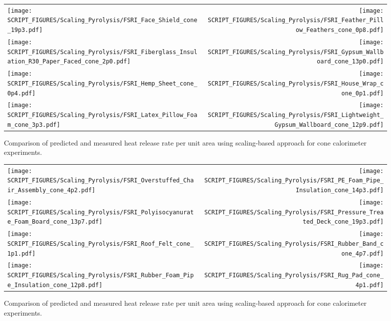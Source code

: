 \begin{figure}[p]
\begin{tabular*}{\textwidth}{l@{\extracolsep{\fill}}r}
\texttt{[image: SCRIPT\_FIGURES/Scaling\_Pyrolysis/FSRI\_Face\_Shield\_cone\_19p3.pdf]} &
\texttt{[image: SCRIPT\_FIGURES/Scaling\_Pyrolysis/FSRI\_Feather\_Pillow\_Feathers\_cone\_0p8.pdf]} \\
\texttt{[image: SCRIPT\_FIGURES/Scaling\_Pyrolysis/FSRI\_Fiberglass\_Insulation\_R30\_Paper\_Faced\_cone\_2p0.pdf]} &
\texttt{[image: SCRIPT\_FIGURES/Scaling\_Pyrolysis/FSRI\_Gypsum\_Wallboard\_cone\_13p0.pdf]} \\
\texttt{[image: SCRIPT\_FIGURES/Scaling\_Pyrolysis/FSRI\_Hemp\_Sheet\_cone\_0p4.pdf]} &
\texttt{[image: SCRIPT\_FIGURES/Scaling\_Pyrolysis/FSRI\_House\_Wrap\_cone\_0p1.pdf]} \\
\texttt{[image: SCRIPT\_FIGURES/Scaling\_Pyrolysis/FSRI\_Latex\_Pillow\_Foam\_cone\_3p3.pdf]} &
\texttt{[image: SCRIPT\_FIGURES/Scaling\_Pyrolysis/FSRI\_Lightweight\_Gypsum\_Wallboard\_cone\_12p9.pdf]} \\
\end{tabular*}
\caption[HRRPUA of FSRI Materials using scaling model , Others materials]
{Comparison of predicted and measured heat release rate per unit area using scaling-based approach for cone calorimeter experiments.}
\label{FSRI_Materials_HRR_Others}
\end{figure}

\begin{figure}[p]
\begin{tabular*}{\textwidth}{l@{\extracolsep{\fill}}r}
\texttt{[image: SCRIPT\_FIGURES/Scaling\_Pyrolysis/FSRI\_Overstuffed\_Chair\_Assembly\_cone\_4p2.pdf]} &
\texttt{[image: SCRIPT\_FIGURES/Scaling\_Pyrolysis/FSRI\_PE\_Foam\_Pipe\_Insulation\_cone\_14p3.pdf]} \\
\texttt{[image: SCRIPT\_FIGURES/Scaling\_Pyrolysis/FSRI\_Polyisocyanurate\_Foam\_Board\_cone\_13p7.pdf]} &
\texttt{[image: SCRIPT\_FIGURES/Scaling\_Pyrolysis/FSRI\_Pressure\_Treated\_Deck\_cone\_19p3.pdf]} \\
\texttt{[image: SCRIPT\_FIGURES/Scaling\_Pyrolysis/FSRI\_Roof\_Felt\_cone\_1p1.pdf]} &
\texttt{[image: SCRIPT\_FIGURES/Scaling\_Pyrolysis/FSRI\_Rubber\_Band\_cone\_4p7.pdf]} \\
\texttt{[image: SCRIPT\_FIGURES/Scaling\_Pyrolysis/FSRI\_Rubber\_Foam\_Pipe\_Insulation\_cone\_12p8.pdf]} &
\texttt{[image: SCRIPT\_FIGURES/Scaling\_Pyrolysis/FSRI\_Rug\_Pad\_cone\_4p1.pdf]} \\
\end{tabular*}
\caption[HRRPUA of FSRI Materials using scaling model , Others materials]
{Comparison of predicted and measured heat release rate per unit area using scaling-based approach for cone calorimeter experiments.}
\label{FSRI_Materials_HRR_Others}
\end{figure}

